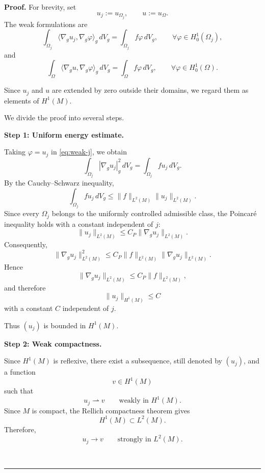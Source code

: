 \documentclass{article}
\newenvironment{proof}[1][Proof]{\textbf{#1.} }{\ \rule{0.5em}{0.5em}}
\begin{document}
\begin{proof}
For brevity, set
\[
u_j:=u_{\Omega_j},
\qquad
u:=u_\Omega.
\]
The weak formulations are
\begin{equation}
\int_{\Omega_j}
\langle\nabla_g u_j,\nabla_g\varphi\rangle_g\,dV_g
=
\int_{\Omega_j}f\varphi\,dV_g,
\qquad
\forall\varphi\in H_0^1(\Omega_j),
\label{eq:weak-j}
\end{equation}
and
\begin{equation}
\int_{\Omega}
\langle\nabla_g u,\nabla_g\varphi\rangle_g\,dV_g
=
\int_{\Omega}f\varphi\,dV_g,
\qquad
\forall\varphi\in H_0^1(\Omega).
\label{eq:weak-limit}
\end{equation}

Since $u_j$ and $u$ are extended by zero outside their domains, we
regard them as elements of $H^1(M)$.

We divide the proof into several steps.

\medskip
\noindent
\textbf{Step 1: Uniform energy estimate.}

Taking $\varphi=u_j$ in \eqref{eq:weak-j}, we obtain
\begin{equation}
\int_{\Omega_j}|\nabla_g u_j|_g^2\,dV_g
=
\int_{\Omega_j}fu_j\,dV_g.
\label{eq:energy-j}
\end{equation}
By the Cauchy--Schwarz inequality,
\[
\int_{\Omega_j}fu_j\,dV_g
\le
\|f\|_{L^2(M)}
\|u_j\|_{L^2(M)}.
\]
Since every $\Omega_j$ belongs to the uniformly controlled admissible
class, the Poincar\'e inequality holds with a constant independent of
$j$:
\begin{equation}
\|u_j\|_{L^2(M)}
\le
C_P\|\nabla_g u_j\|_{L^2(M)}.
\label{eq:uniform-poincare}
\end{equation}
Consequently,
\[
\|\nabla_g u_j\|_{L^2(M)}^2
\le
C_P\|f\|_{L^2(M)}
\|\nabla_g u_j\|_{L^2(M)}.
\]
Hence
\[
\|\nabla_g u_j\|_{L^2(M)}
\le
C_P\|f\|_{L^2(M)},
\]
and therefore
\begin{equation}
\|u_j\|_{H^1(M)}
\le C
\label{eq:uniform-H1}
\end{equation}
with a constant $C$ independent of $j$.

Thus $(u_j)$ is bounded in $H^1(M)$.

\medskip
\noindent
\textbf{Step 2: Weak compactness.}

Since $H^1(M)$ is reflexive, there exist a subsequence, still denoted
by $(u_j)$, and a function
\[
v\in H^1(M)
\]
such that
\begin{equation}
u_j\rightharpoonup v
\qquad\text{weakly in }H^1(M).
\label{eq:weak-convergence}
\end{equation}
Since $M$ is compact, the Rellich compactness theorem gives
\[
H^1(M)\subset L^2(M).
\]
Therefore,
\begin{equation}
u_j\longrightarrow v
\qquad\text{strongly in }L^2(M).
\label{eq:strong-L2}
\end{equation}


\end{proof}
\end{document}
